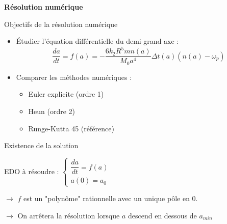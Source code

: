 \documentclass{beamer}
\begin{document}
	
	\begin{frame}
		\begin{center}
			\huge{\textbf{Résolution numérique}}
		\end{center}
	\end{frame}
	
	\begin{frame}{Objectifs de la résolution numérique}
		\begin{block}{}
			\begin{itemize}
				\item Étudier l'équation différentielle du demi-grand axe :
				\[
				\frac{da}{dt} = f(a) = -\frac{6k_2R^5mn(a)}{M_0a^4}\Delta t(a)(n(a) - \omega_p)
				\]
				\item Comparer les méthodes numériques :
				\begin{itemize}
					\item Euler explicite (ordre 1)
					\item Heun (ordre 2)
					\item Runge-Kutta 45 (référence)
				\end{itemize}
			\end{itemize}
		\end{block}
	\end{frame}
	
	\begin{frame}{Existence de la solution}
		
		\begin{center}
			EDO à résoudre : $\begin{cases}
				\dfrac{da}{dt} = f(a)\\
				a(0) = a_0
			\end{cases}$
			
			\vspace{.5cm}
			
			$\to$ $f$ est un "polynôme" rationnelle avec un unique pôle en 0.\pause
			
			\vspace{.5cm}
			
			$\to$ On arrêtera la résolution lorsque $a$ descend en dessous de $a_{min}$
		\end{center}
		
	\end{frame}
	
\end{document}

